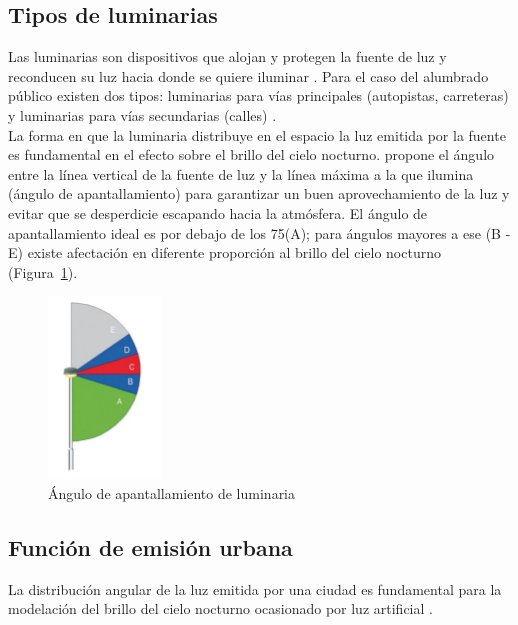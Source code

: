 \newpage

\subsection{Tipos de luminarias}
\label{subsec:luminarias}

Las luminarias son dispositivos que alojan y protegen la fuente de luz y reconducen su luz hacia donde se quiere iluminar \citep{LibroCL}. Para el caso del alumbrado público existen dos tipos: luminarias para vías principales (autopistas, carreteras) y luminarias para vías secundarias (calles) \citep{INFO2019}.\\

La forma en que la luminaria distribuye en el espacio la luz emitida por la fuente es fundamental en el efecto sobre el brillo del cielo nocturno. \cite{Marin2009} propone el ángulo entre la línea vertical de la fuente de luz y la línea máxima a la que ilumina (ángulo de apantallamiento) para garantizar un buen aprovechamiento de la luz y evitar que se desperdicie escapando hacia la atmósfera. El ángulo de apantallamiento ideal es por debajo de los 75\grad (A); para ángulos mayores a ese (B - E) existe afectación en diferente proporción al brillo del cielo nocturno (Figura~\ref{anguloapantallamiento}).


\begin{figure}[htb]
  \centering
    \includegraphics[width=30mm, scale=0.3]{anguloapantallamiento}
  \caption{Ángulo de apantallamiento de luminaria \citep{Marin2009}}
  \label{anguloapantallamiento}
\end{figure}


\subsection{Función de emisión urbana}

La distribución angular de la luz emitida por una ciudad es fundamental para la modelación del brillo del cielo nocturno ocasionado por luz artificial \citep{Kocifaj2014}.\\


